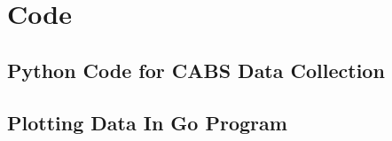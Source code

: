 \chapter{Code}
\label{appendix: Code}
\acresetall

\section{Python Code for CABS Data Collection}



\clearpage

\section{Plotting Data In Go Program}


